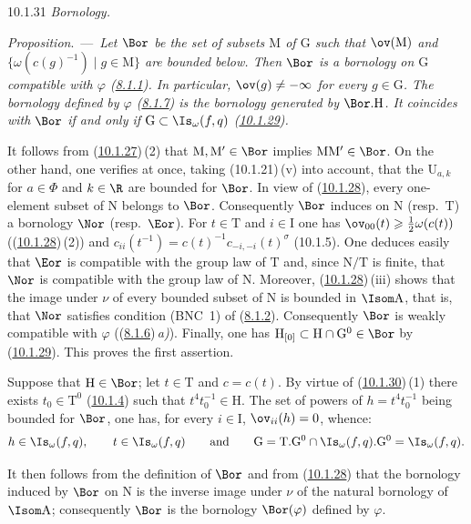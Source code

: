 \documentclass[12pt,a4paper,oneside,english]{smfart}
\makeatletter
\newcommand{\btanchor}[1]{\leavevmode\Hy@raisedlink{\hypertarget{bt:#1}{}}}
\newcommand{\btref}[1]{\hyperlink{bt:#1}{#1}}
\newcommand{\btunnum}[1]{\par\medskip\noindent\emph{#1}.\ ---\ \ignorespaces}
\theoremstyle{definition}
\theoremstyle{bt}
\makeatother
\begin{document}
\num{10.1.31}\btanchor{10.1.31} \emph{Bornology.}

\btunnum{Proposition}\emph{Let $\Bor$ be the set of subsets
$\mathrm{M}$ of $\mathrm{G}$ such that $\ov(\mathrm{M})$ and
$\{\omega(c(g)^{-1})\mid g\in \mathrm{M}\}$ are bounded below. Then $\Bor$ is a
bornology on $\mathrm{G}$ compatible with $\varphi$ (\btref{8.1.1}). In particular,
$\ov(g)\neq-\infty$ for every $g\in\mathrm{G}$. The bornology defined by
$\varphi$ (\btref{8.1.7}) is the bornology generated by $\Bor.\mathrm{H}$. It coincides
with $\Bor$ if and only if $\mathrm{G}\subset \Is_\omega(f,q)$ (\btref{10.1.29}).}

\pf
It follows from (\btref{10.1.27})\,(2) that $\mathrm{M},\mathrm{M}'\in\Bor$ implies
$\mathrm{M}\mathrm{M}'\in\Bor$. On the other hand, one verifies at once, taking
(10.1.21)\,(v) into account, that the $\mathrm{U}_{a,k}$ for $a\in\Phi$ and
$k\in\R$ are bounded for $\Bor$. In view of (\btref{10.1.28}), every one-element subset
of $\mathrm{N}$ belongs to $\Bor$. Consequently $\Bor$ induces on $\mathrm{N}$
(resp.\ $\mathrm{T}$) a bornology $\Nor$ (resp.\ $\Eor$). For
$t\in\mathrm{T}$ and $i\in\mathrm{I}$ one has
$\ov_{00}(t)\geqslant\frac{1}{2}\omega(c(t))$ ((\btref{10.1.28})\,(2)) and
$c_{ii}(t^{-1})=c(t)^{-1}c_{-i,-i}(t)^{\sigma}$ (10.1.5). One deduces easily
that $\Eor$ is compatible with the group law of $\mathrm{T}$ and, since
$\mathrm{N}/\mathrm{T}$ is finite, that $\Nor$ is compatible with the group law
of $\mathrm{N}$. Moreover, (\btref{10.1.28})\,(iii) shows that the image under $\nu$ of
every bounded subset of $\mathrm{N}$ is bounded in $\Isom \mathrm{A}$, that is,
that $\Nor$ satisfies condition (BNC~1) of (\btref{8.1.2}). Consequently $\Bor$ is
weakly compatible with $\varphi$ ((\btref{8.1.6})\,\emph{a)}). Finally, one has
$\mathrm{H}_{[0]}\subset \mathrm{H}\cap \mathrm{G}^{0}\in\Bor$ by (\btref{10.1.29}).
This proves the first assertion.

Suppose that $\mathrm{H}\in\Bor$; let $t\in\mathrm{T}$ and $c=c(t)$. By virtue
of (\btref{10.1.30})\,(1) there exists $t_0\in\mathrm{T}^{0}$ (\btref{10.1.4}) such that
$t^{4}t_0^{-1}\in \mathrm{H}$. The set of powers of $h=t^{4}t_0^{-1}$ being
bounded for $\Bor$, one has, for every $i\in\mathrm{I}$, $\ov_{ii}(h)=0$, whence:
\[
h\in \Is_\omega(f,q),\qquad t\in \Is_\omega(f,q)
\qquad\text{and}\qquad
\mathrm{G}=\mathrm{T}.\mathrm{G}^{0}\cap \Is_\omega(f,q).\mathrm{G}^{0}=\Is_\omega(f,q).
\]

It then follows from the definition of $\Bor$ and from (\btref{10.1.28}) that the
bornology induced by $\Bor$ on $\mathrm{N}$ is the inverse image under $\nu$ of
the natural bornology of $\Isom \mathrm{A}$; consequently $\Bor$ is the
bornology $\Bor(\varphi)$ defined by $\varphi$.
\end{document}
